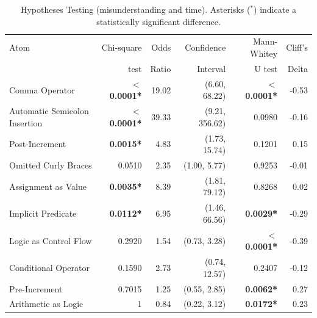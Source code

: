  \begin{table}[ht]
\caption{Hypotheses Testing (misunderstanding and time). Asterisks ($^{*}$) indicate a statistically significant difference.}
 \centering
 {\scriptsize
 \begin{tabular}{lrrr|rr}
   \toprule
Atom  & Chi-square & Odds          & Confidence & Mann-Whitey& Cliff's\\ 
 &  test &Ratio          & Interval &  U test & Delta \\  \midrule
Comma Operator & \textbf{$<$ 0.0001*} & 19.02 & (6.60, 68.22) & \textbf{$<$ 0.0001*} & -0.53 \\ 
Automatic Semicolon Insertion & \textbf{$<$ 0.0001*} & 39.33 & (9.21, 356.62) & 0.0980 & -0.16 \\ 
Post-Increment & \textbf{0.0015*} & 4.83 & (1.73, 15.74) & 0.1201 & 0.15 \\ 
Omitted Curly Braces & 0.0510 & 2.35 & (1.00, 5.77) & 0.9253 & -0.01 \\ 
Assignment as Value & \textbf{0.0035*} & 8.39 & (1.81, 79.12) & 0.8268 & 0.02 \\ 
Implicit Predicate & \textbf{0.0112*} & 6.95 & (1.46, 66.56) & \textbf{0.0029*} & -0.29 \\ 
Logic as Control Flow & 0.2920 & 1.54 & (0.73, 3.28) & \textbf{$<$ 0.0001*} & -0.39 \\ 
Conditional Operator & 0.1590 & 2.73 & (0.74, 12.57) & 0.2407 & -0.12 \\ 
Pre-Increment & 0.7015 & 1.25 & (0.55, 2.85) & \textbf{0.0062*} & 0.27 \\ 
Arithmetic as Logic & 1 & 0.84 & (0.22, 3.12) & \textbf{0.0172*} & 0.23 \\ 
    \bottomrule
 \end{tabular}}
 \label{tab:hypothesis-testing}
 \end{table}


